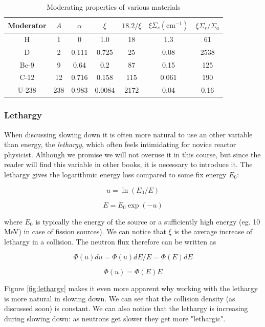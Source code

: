 \begin{table}\caption{Moderating properties of various materials}\label{tab:moderator}
\begin{tabular}{c | c | c | c | c | c | c}
Moderator & $A$ & $\alpha$ & $\xi$ & $18.2/\xi$ & $\xi\Sigma_s (\text{cm}^{-1})$ & $\xi\Sigma_s/\Sigma_a$ \\
\hline
H & 1 & 0 & 1.0 & 18 & 1.3 & 61 \\
D & 2 & 0.111 & 0.725 & 25 & 0.08 & 2538 \\
Be-9 & 9 & 0.64 & 0.2 & 87 & 0.15 & 125 \\
C-12 & 12 & 0.716 & 0.158 & 115 & 0.061 & 190 \\
U-238 & 238 & 0.983 & 0.0084 & 2172 & 0.04 & 0.16
\end{tabular}
\end{table}

\subsubsection*{Lethargy}

When discussing slowing down it is often more natural to use an other variable than energy, the \textit{lethargy}, which often feels intimidating for novice reactor physicist. Although we promise we will not overuse it in this course, but since the reader will find this variable in other books, it is necessary to introduce it. The lethargy gives the logarithmic energy loss compared to some fix energy $E_0$:

$$u=\ln(E_0/E)$$

$$E=E_0\exp(-u)$$

\noindent where $E_0$ is typically the energy of the source or a sufficiently high energy (eg. 10 MeV) in case of fission sources). We can notice  that $\xi$ is the average increase of lethargy in a collision. The neutron flux therefore can be written as

$$\Phi (u)du=\Phi (u)dE/E=\Phi (E)dE$$

$$\Phi(u)=\Phi(E)E$$

Figure \ref{fig:lethargy} makes it even more apparent why working with the lethargy is more natural in slowing down. We can see that the collision density (as discussed soon) is constant. We can also notice that the lethargy is increasing during slowing down: as neutrons get slower they get more "lethargic".


